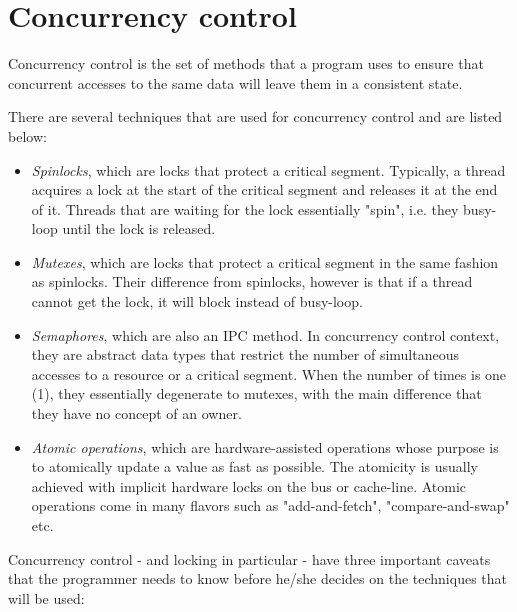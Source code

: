 \section{Concurrency control\label{sec:conc-theory}}

Concurrency control is the set of methods that a program uses to ensure that 
concurrent accesses to the same data will leave them in a consistent state.

There are several techniques that are used for concurrency control and are 
listed below:

\begin{itemize}
	\item \textit{Spinlocks}, which are locks that protect a critical segment.  
		Typically, a thread acquires a lock at the start of the critical 
		segment and releases it at the end of it. Threads that are waiting for 
		the lock essentially "spin", i.e. they busy-loop until the lock is 
		released.
	\item \textit{Mutexes}, which are locks that protect a critical segment in 
		the same fashion as spinlocks. Their difference from spinlocks, however 
		is that if a thread cannot get the lock, it will block instead of 
		busy-loop.
	\item \textit{Semaphores}, which are also an IPC method. In concurrency 
		control context, they are abstract data types that restrict the 
		number of simultaneous accesses to a resource or a critical 
		segment.  When the number of times is one (1), they essentially 
		degenerate to mutexes, with the main difference that they have 
		no concept of an owner.
	\item \textit{Atomic operations}, which are hardware-assisted 
		operations whose purpose is to atomically update a value as 
		fast as possible. The atomicity is usually achieved with 
		implicit hardware locks on the bus or cache-line.  Atomic 
		operations come in many flavors such as "add-and-fetch", 
		"compare-and-swap" etc.
\end{itemize}

Concurrency control - and locking in particular - have three important caveats 
that the programmer needs to know before he/she decides on the techniques that 
will be used:

